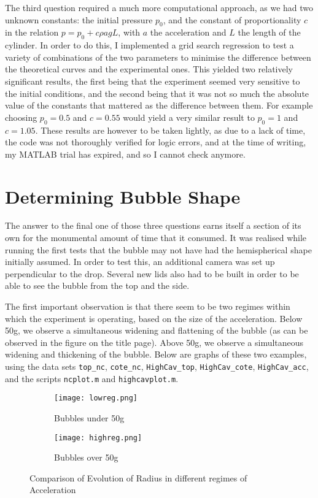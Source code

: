 \documentclass{article}
\begin{document}
The third question required a much more computational approach, as we had two unknown constants: the initial pressure $p_0$, and the constant of proportionality $c$ in the relation $p = p_0 + c\rho a g L$, with $a$ the acceleration and $L$ the length of the cylinder. In order to do this, I implemented a grid search regression to test a variety of combinations of the two parameters to minimise the difference between the theoretical curves and the experimental ones. This yielded two relatively significant results, the first being that the experiment seemed very sensitive to the initial conditions, and the second being that it was not so much the absolute value of the constants that mattered as the difference between them. For example choosing $p_0 = 0.5$  and $c = 0.55$ would yield a very similar result to $p_0 = 1$  and $c = 1.05$. These results are however to be taken lightly, as due to a lack of time, the code was not thoroughly verified for logic errors, and at the time of writing, my MATLAB trial has expired, and so I cannot check anymore.

\section{Determining Bubble Shape}


The answer to the final one of those three questions earns itself a section of its own for the monumental amount of time that it consumed. It was realised while running the first tests that the bubble may not have had the hemispherical shape initially assumed. In order to test this, an additional camera was set up perpendicular to the drop. Several new lids also had to be built in order to be able to see the bubble from the top and the side. 

The first important observation is that there seem to be two regimes within which the experiment is operating, based on the size of the acceleration. Below 50g, we observe a simultaneous widening and flattening of the bubble (as can be observed in the figure on the title page). Above 50g, we observe a simultaneous widening and thickening of the bubble. Below are graphs of these two examples, using the data sets \texttt{top\_nc}, \texttt{cote\_nc}, \texttt{HighCav\_top}, \texttt{HighCav\_cote}, \texttt{HighCav\_acc}, and the scripts \texttt{ncplot.m} and \texttt{highcavplot.m}.
\begin{figure}[H]
  \centering
  \begin{subfigure}[b]{0.49\linewidth}
    \texttt{[image: lowreg.png]}
    \caption{Bubbles under 50g}
  \end{subfigure}
  \begin{subfigure}[b]{0.49\linewidth}
    \texttt{[image: highreg.png]}
    \caption{Bubbles over 50g}
  \end{subfigure}
  \caption{Comparison of Evolution of Radius in different regimes of Acceleration}
\end{figure}
\end{document}
